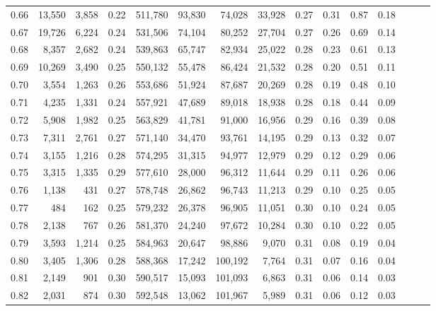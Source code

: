 \begin{tabular}{rrrrrrrrrrrrrrr}
0.66 &  13,550 &  3,858 &  0.22 &  511,780 &   93,830 &   74,028 &   33,928 &  0.27 &  0.31 &  0.87 &      0.18 \\
0.67 &  19,726 &  6,224 &  0.24 &  531,506 &   74,104 &   80,252 &   27,704 &  0.27 &  0.26 &  0.69 &      0.14 \\
0.68 &   8,357 &  2,682 &  0.24 &  539,863 &   65,747 &   82,934 &   25,022 &  0.28 &  0.23 &  0.61 &      0.13 \\
0.69 &  10,269 &  3,490 &  0.25 &  550,132 &   55,478 &   86,424 &   21,532 &  0.28 &  0.20 &  0.51 &      0.11 \\
0.70 &   3,554 &  1,263 &  0.26 &  553,686 &   51,924 &   87,687 &   20,269 &  0.28 &  0.19 &  0.48 &      0.10 \\
0.71 &   4,235 &  1,331 &  0.24 &  557,921 &   47,689 &   89,018 &   18,938 &  0.28 &  0.18 &  0.44 &      0.09 \\
0.72 &   5,908 &  1,982 &  0.25 &  563,829 &   41,781 &   91,000 &   16,956 &  0.29 &  0.16 &  0.39 &      0.08 \\
0.73 &   7,311 &  2,761 &  0.27 &  571,140 &   34,470 &   93,761 &   14,195 &  0.29 &  0.13 &  0.32 &      0.07 \\
0.74 &   3,155 &  1,216 &  0.28 &  574,295 &   31,315 &   94,977 &   12,979 &  0.29 &  0.12 &  0.29 &      0.06 \\
0.75 &   3,315 &  1,335 &  0.29 &  577,610 &   28,000 &   96,312 &   11,644 &  0.29 &  0.11 &  0.26 &      0.06 \\
0.76 &   1,138 &    431 &  0.27 &  578,748 &   26,862 &   96,743 &   11,213 &  0.29 &  0.10 &  0.25 &      0.05 \\
0.77 &     484 &    162 &  0.25 &  579,232 &   26,378 &   96,905 &   11,051 &  0.30 &  0.10 &  0.24 &      0.05 \\
0.78 &   2,138 &    767 &  0.26 &  581,370 &   24,240 &   97,672 &   10,284 &  0.30 &  0.10 &  0.22 &      0.05 \\
0.79 &   3,593 &  1,214 &  0.25 &  584,963 &   20,647 &   98,886 &    9,070 &  0.31 &  0.08 &  0.19 &      0.04 \\
0.80 &   3,405 &  1,306 &  0.28 &  588,368 &   17,242 &  100,192 &    7,764 &  0.31 &  0.07 &  0.16 &      0.04 \\
0.81 &   2,149 &    901 &  0.30 &  590,517 &   15,093 &  101,093 &    6,863 &  0.31 &  0.06 &  0.14 &      0.03 \\
0.82 &   2,031 &    874 &  0.30 &  592,548 &   13,062 &  101,967 &    5,989 &  0.31 &  0.06 &  0.12 &      0.03 \\

\end{tabular}

